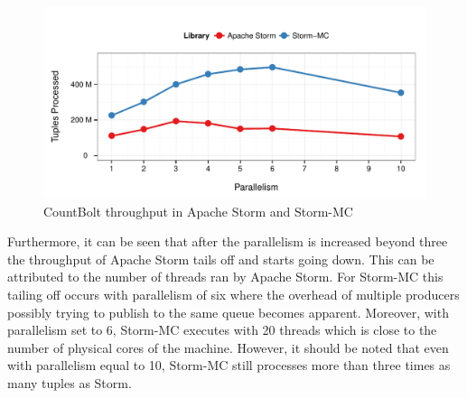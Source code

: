 \documentclass[bsc,logo,frontabs,twoside,singlespacing,normalheadings,parskip]{infthesis}\usepackage[]{graphicx}\usepackage[]{color}
\makeatletter
\def\maxwidth{ %
  \ifdim\Gin@nat@width>\linewidth
    \linewidth
  \else
    \Gin@nat@width
  \fi
}
\newenvironment{knitrout}{}{} %
\makeatother
\begin{document}
\begin{knitrout}
\color{fgcolor}\begin{figure}[!htb]

{\centering \includegraphics[width=\maxwidth]{figure/countbolt-plot-1} 

}

\caption[CountBolt throughput in Apache Storm and Storm-MC]{CountBolt throughput in Apache Storm and Storm-MC}\label{fig:countbolt-plot}
\end{figure}


\end{knitrout}

Furthermore, it can be seen that after the parallelism is increased beyond three the throughput of Apache Storm tails off and starts going down. This can be attributed to the number of threads ran by Apache Storm. For Storm-MC this tailing off occurs with parallelism of six where the overhead of multiple producers possibly trying to publish to the same queue becomes apparent. Moreover, with parallelism set to 6, Storm-MC executes with 20 threads which is close to the number of physical cores of the machine. However, it should be noted that even with parallelism equal to 10, Storm-MC still processes more than three times as many tuples as Storm.
\end{document}
